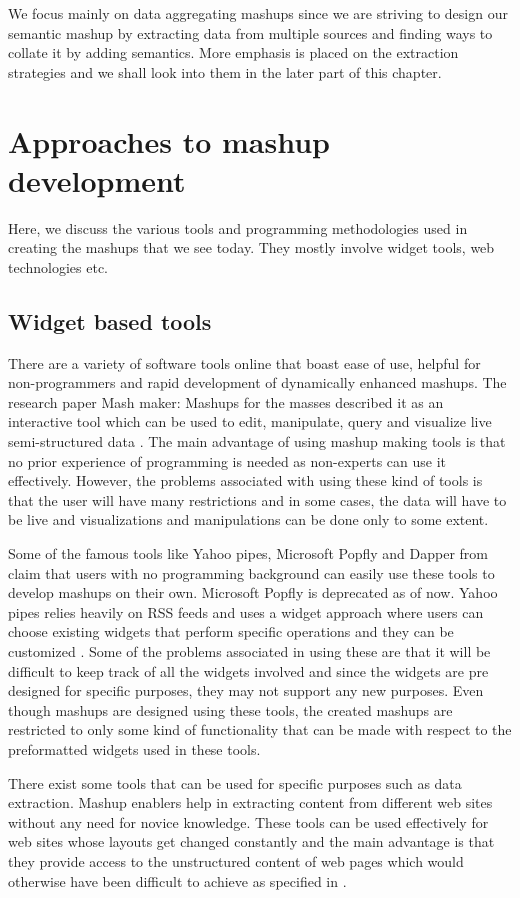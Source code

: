 We focus mainly on data aggregating mashups since we are striving to design our semantic mashup by extracting data from multiple sources and finding ways to collate it by adding semantics. More emphasis is placed on the extraction strategies and we shall look into them in the later part of this chapter.

\section{Approaches to mashup development}
Here, we discuss the various tools and programming methodologies used in creating the mashups that we see today. They mostly involve widget tools, web technologies etc.

\subsection{Widget based tools}
There are a variety of software tools online that boast ease of use, helpful for non-programmers and rapid development of dynamically enhanced mashups. The research paper Mash maker: Mashups for the masses described it as an interactive tool which can be used to edit, manipulate, query and visualize live semi-structured data \cite{13}. The main advantage of using mashup making tools is that no prior experience of programming is needed as non-experts can use it effectively. However, the problems associated with using these kind of tools is that the user will have many restrictions and in some cases, the data will have to be live and visualizations and manipulations can be done only to some extent.

Some of the famous tools like Yahoo pipes, Microsoft Popfly and Dapper from \cite{14} claim that users with no programming background can easily use these tools to develop mashups on their own. Microsoft Popfly is deprecated as of now. Yahoo pipes relies heavily on RSS feeds and uses a widget approach where users can choose existing widgets that perform specific operations and they can be customized \cite{14}. Some of the problems associated in using these are that it will be difficult to keep track of all the widgets involved and since the widgets are pre designed for specific purposes, they may not support any new purposes. Even though mashups are designed using these tools, the created mashups are restricted to only some kind of functionality that can be made with respect to the preformatted widgets used in these tools.

There exist some tools that can be used for specific purposes such as data extraction. Mashup enablers help in extracting content from different web sites without any need for novice knowledge. These tools can be used effectively for web sites whose layouts get changed constantly and the main advantage is that they provide access to the unstructured content of web pages which would otherwise have been difficult to achieve as specified in \cite{15}.

